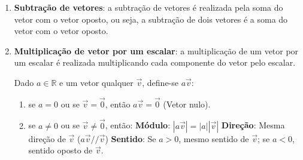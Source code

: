 \documentclass[12pt]{article}
\begin{document}
\begin{enumerate}
    \item \textbf{Subtração de vetores}: a subtração de vetores é realizada pela soma do vetor com o vetor oposto, ou seja, a subtração de dois vetores é a soma do vetor com o vetor oposto.
    \item \textbf{Multiplicação de vetor por um escalar}: a multiplicação de um vetor por um escalar é realizada multiplicando cada componente do vetor pelo escalar.
    
    Dado $a \in \mathbb{R}$ e um vetor qualquer $\overrightarrow{v}$, define-se $a \overrightarrow{v}$:
    \begin{enumerate}[label=\alph*)]
        \item se $a=0$ ou se $\overrightarrow{v} = \overrightarrow{0}$, então $a \overrightarrow{v} = \overrightarrow{0}$ (Vetor nulo).
        \item se $a \neq 0$ ou se $\overrightarrow{v} \neq \overrightarrow{0}$, então:
            \subitem            \textbf{Módulo}: $|a\overrightarrow{v}| = |a||\overrightarrow{v}|$
            \subitem           \textbf{Direção}: Mesma direção de $\overrightarrow{v}$ ($a\overrightarrow{v} // \overrightarrow{v}$)
            \subitem           \textbf{Sentido}: Se $a > 0$, mesmo sentido de $\overrightarrow{v}$;
            \subitem {}se $a < 0$, sentido oposto de $\overrightarrow{v}$.
    \end{enumerate}
\end{enumerate}
\end{document}

